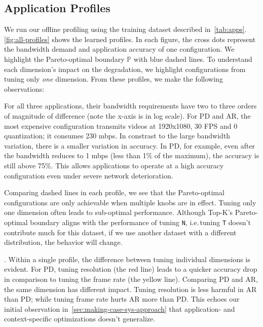 \subsection{Application Profiles}
\label{sec:application-profiles}

We run our offline profiling using the training dataset described
in~\autoref{tab:apps}.  \autoref{fig:all-profiles} shows the learned
profiles. In each figure, the cross dots represent the bandwidth demand and
application accuracy of one configuration. We highlight the Pareto-optimal
boundary $\mathbb{P}$ with blue dashed lines. To understand each dimension's
impact on the degradation, we highlight configurations from tuning only
\textit{one} dimension. From these profiles, we make the following observations:

 For all three applications, their bandwidth
requirements have two to three orders of magnitude of difference (note the
x-axis is in log scale). For PD and AR, the most expensive configuration
transmits videos at 1920x1080, 30 FPS and 0 quantization; it consumes 230 mbps. In
constrast to the large bandwidth variation, there is a smaller variation in
accuracy. In PD, for example, even after the bandwidth reduces to 1 mbps (less
than 1\% of the maximum), the accuracy is still above 75\%. This allows
\sysname{} applications to operate at a high accuracy configuration even under
severe network deterioration.

 Comparing dashed lines in each
profile, we see that the Pareto-optimal configurations are only achievable when
multiple knobs are in effect. Tuning only one dimension often leads to
sub-optimal performance. Although Top-K's Pareto-optimal boundary aligns with
the performance of tuning \texttt{N}, i.e.\,tuning \texttt{T} doesn't contribute
much for this dataset, if we use another dataset with a different distribution,
the behavior will change.

. Within a single profile, the
difference between tuning individual dimensions is evident. For PD, tuning
resolution (the red line) leads to a quicker accuracy drop in comparison to
tuning the frame rate (the yellow line). Comparing PD and AR, the same dimension
has different impact. Tuning resolution is less harmful in AR than PD; while
tuning frame rate hurts AR more than PD\@. This echoes our initial observation
in~\autoref{sec:making-case-sys-approach} that application- and context-specific
optimizations doesn't generalize.


